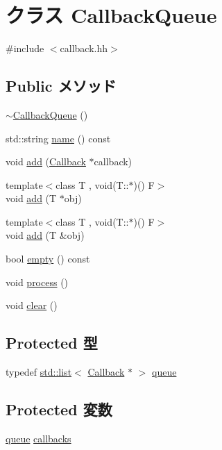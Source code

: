 \hypertarget{classCallbackQueue}{
\section{クラス CallbackQueue}
\label{classCallbackQueue}
}


{\ttfamily \#include $<$callback.hh$>$}\subsection*{Public メソッド}
\begin{DoxyCompactItemize}
\item 
\hyperlink{classCallbackQueue_a10ceab855dc1cc8986eca6ed6cf7cf83}{$\sim$CallbackQueue} ()
\item 
std::string \hyperlink{classCallbackQueue_a37627d5d5bba7f4a8690c71c2ab3cb07}{name} () const 
\item 
void \hyperlink{classCallbackQueue_ac5718710d8be5c000db17f6a185a8929}{add} (\hyperlink{classCallback}{Callback} $\ast$callback)
\item 
{\footnotesize template$<$class T , void(T::$\ast$)() F$>$ }\\void \hyperlink{classCallbackQueue_ae5e7961583b6a941534052a0dc3f4ff2}{add} (T $\ast$obj)
\item 
{\footnotesize template$<$class T , void(T::$\ast$)() F$>$ }\\void \hyperlink{classCallbackQueue_a234331465f9a22334474727a02218f51}{add} (T \&obj)
\item 
bool \hyperlink{classCallbackQueue_ac6e61de369e994009e36f344f99c15ad}{empty} () const 
\item 
void \hyperlink{classCallbackQueue_a2e9c5136d19b1a95fc427e0852deab5c}{process} ()
\item 
void \hyperlink{classCallbackQueue_ac8bb3912a3ce86b15842e79d0b421204}{clear} ()
\end{DoxyCompactItemize}
\subsection*{Protected 型}
\begin{DoxyCompactItemize}
\item 
typedef \hyperlink{classstd_1_1list}{std::list}$<$ \hyperlink{classCallback}{Callback} $\ast$ $>$ \hyperlink{classCallbackQueue_acff8b7ceee019b76371bd54bb1249350}{queue}
\end{DoxyCompactItemize}
\subsection*{Protected 変数}
\begin{DoxyCompactItemize}
\item 
\hyperlink{classstd_1_1list}{queue} \hyperlink{classCallbackQueue_adea119b8021b9fd601349742aacced4a}{callbacks}
\end{DoxyCompactItemize}


